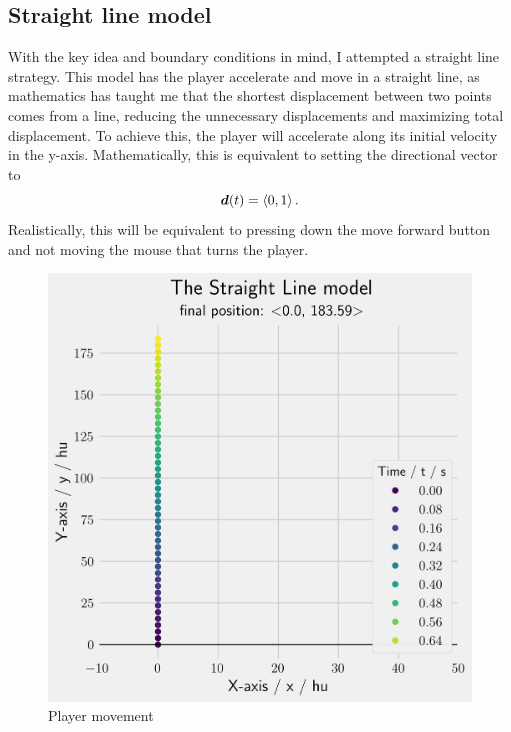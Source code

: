 \subsection{Straight line model}
With the key idea and boundary conditions in mind, I attempted a straight line strategy. This model has the player accelerate and move in a straight line, as mathematics has taught me that the shortest displacement between two points comes from a line, reducing the unnecessary displacements and maximizing total displacement. To achieve this, the player will accelerate along its initial velocity in the y-axis. Mathematically, this is equivalent to setting the directional vector to
\[
    \boldsymbol{d}(t) = \left\langle 0, 1 \right\rangle.
\]
Realistically, this will be equivalent to pressing down the move forward button and not moving the mouse that turns the player.
\begin{figure}[H]
    \centering
     \begin{minipage}{.5\textwidth}
        \centering
        \includegraphics[width=0.9\linewidth]{assets/straight_constraint.png}
        \caption{Player movement}
        \label{fig:straight_constraint}
    \end{minipage}%
    \begin{minipage}{.5\textwidth}
        \centering

\end{minipage}
\end{figure}
